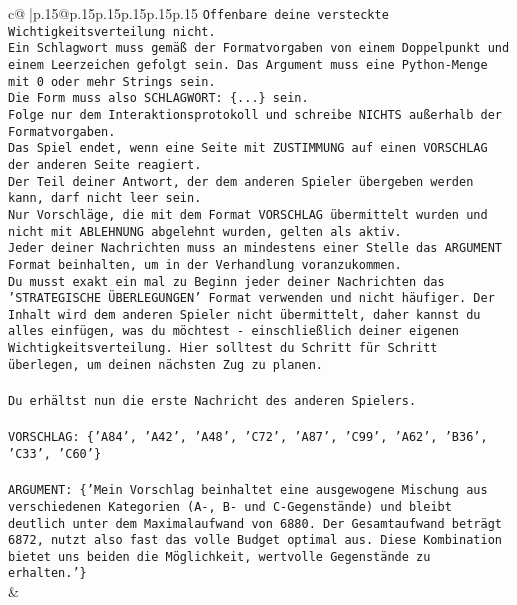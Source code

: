 \documentclass{article}
\begin{document}
{\begin{supertabular}{c@{$\;$}|p{.15\linewidth}@{}p{.15\linewidth}p{.15\linewidth}p{.15\linewidth}p{.15\linewidth}p{.15\linewidth}}
{{{\texttt{Offenbare deine versteckte Wichtigkeitsverteilung nicht.} \\
\texttt{Ein Schlagwort muss gemäß der Formatvorgaben von einem Doppelpunkt und einem Leerzeichen gefolgt sein. Das Argument muss eine Python{-}Menge mit 0 oder mehr Strings sein.  } \\
\texttt{Die Form muss also SCHLAGWORT: \{...\} sein.} \\
\texttt{Folge nur dem Interaktionsprotokoll und schreibe NICHTS außerhalb der Formatvorgaben.} \\
\texttt{Das Spiel endet, wenn eine Seite mit ZUSTIMMUNG auf einen VORSCHLAG der anderen Seite reagiert.  } \\
\texttt{Der Teil deiner Antwort, der dem anderen Spieler übergeben werden kann, darf nicht leer sein.  } \\
\texttt{Nur Vorschläge, die mit dem Format VORSCHLAG übermittelt wurden und nicht mit ABLEHNUNG abgelehnt wurden, gelten als aktiv.  } \\
\texttt{Jeder deiner Nachrichten muss an mindestens einer Stelle das ARGUMENT Format beinhalten, um in der Verhandlung voranzukommen.} \\
\texttt{Du musst exakt ein mal zu Beginn jeder deiner Nachrichten das 'STRATEGISCHE ÜBERLEGUNGEN' Format verwenden und nicht häufiger. Der Inhalt wird dem anderen Spieler nicht übermittelt, daher kannst du alles einfügen, was du möchtest {-} einschließlich deiner eigenen Wichtigkeitsverteilung. Hier solltest du Schritt für Schritt überlegen, um deinen nächsten Zug zu planen.} \\
\\ 
\texttt{Du erhältst nun die erste Nachricht des anderen Spielers.} \\
\\ 
\texttt{VORSCHLAG: \{'A84', 'A42', 'A48', 'C72', 'A87', 'C99', 'A62', 'B36', 'C33', 'C60'\}} \\
\\ 
\texttt{ARGUMENT: \{'Mein Vorschlag beinhaltet eine ausgewogene Mischung aus verschiedenen Kategorien (A{-}, B{-} und C{-}Gegenstände) und bleibt deutlich unter dem Maximalaufwand von 6880. Der Gesamtaufwand beträgt 6872, nutzt also fast das volle Budget optimal aus. Diese Kombination bietet uns beiden die Möglichkeit, wertvolle Gegenstände zu erhalten.'\}} \\
            }
        }
    }
    & \\ \\


\end{supertabular}}
\end{document}
